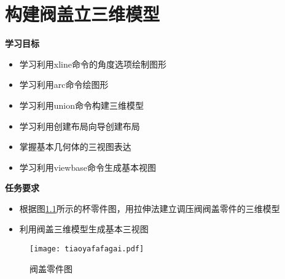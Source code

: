 \chapter{构建阀盖立三维模型}

{\bfseries 学习目标}
\begin{itemize}
\item 学习利用xline命令的角度选项绘制图形
\item 学习利用arc命令绘图形
\item 学习利用union命令构建三维模型
\item 学习利用创建布局向导创建布局
\item 掌握基本几何体的三视图表达
\item 学习利用viewbase命令生成基本视图
\end{itemize}

{\bfseries 任务要求}
\begin{itemize}
\item 根据图\ref{fig:tiaoyafafagai}所示的杯零件图，用拉伸法建立调压阀阀盖零件的三维模型
\item 利用阀盖三维模型生成基本三视图
\end{itemize}

\noindent
\begin{figure}[htbp]
\centering
\texttt{[image: tiaoyafafagai.pdf]}
\caption{阀盖零件图}\label{fig:tiaoyafafagai}
\end{figure}
\clearpage





\endinput